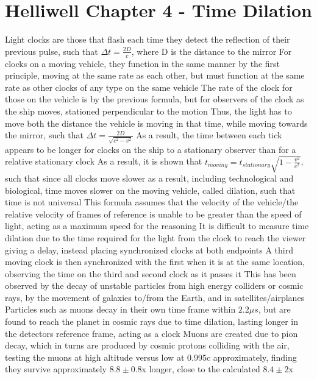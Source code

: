 \documentclass[11 pt, twoside]{article}
\newenvironment{outline*}
{
	\begin{outline}[enumerate]
	}
	{\end{outline}
}
\begin{document}
\section{Helliwell Chapter 4 - Time Dilation}
\begin{outline*}
\1 Light clocks are those that flash each time they detect the reflection of their previous pulse, such that $\Delta t = \frac{2D}{c}$, where D is the distance to the mirror
\2 For clocks on a moving vehicle, they function in the same manner by the first principle, moving at the same rate as each other, but must function at the same rate as other clocks of any type on the same vehicle
\2 The rate of the clock for those on the vehicle is by the previous formula, but for observers of the clock as the ship moves, stationed perpendicular to the motion
\3 Thus, the light has to move both the distance the vehicle is moving in that time, while moving towards the mirror, such that $\Delta t = \frac{2D}{\sqrt{c^2 - v^2}}$
\3 As a result, the time between each tick appears to be longer for clocks on the ship to a stationary observer than for a relative stationary clock
\1 As a result, it is shown that $t_{moving} = t_{stationary}\sqrt{1 - \frac{v^2}{c^2}}$, such that since all clocks move slower as a result, including technological and biological, time moves slower on the moving vehicle, called dilation, such that time is not universal
\2 This formula assumes that the velocity of the vehicle/the relative velocity of frames of reference is unable to be greater than the speed of light, acting as a maximum speed for the reasoning
\1 It is difficult to measure time dilation due to the time required for the light from the clock to reach the viewer giving a delay, instead placing synchronized clocks at both endpoints
\2 A third moving clock is then synchronized with the first when it is at the same location, observing the time on the third and second clock as it passes it
\2 This has been observed by the decay of unstable particles from high energy colliders or cosmic rays, by the movement of galaxies to/from the Earth, and in satellites/airplanes
\3 Particles such as muons decay in their own time frame within $2.2 \mu s$, but are found to reach the planet in cosmic rays due to time dilation, lasting longer in the detectors reference frame, acting as a clock
\3 Muons are created due to pion decay, which in turns are produced by cosmic protons colliding with the air, testing the muons at high altitude versus low at 0.995c approximately, finding they survive approximately $8.8 \pm 0.8$x longer, close to the calculated $8.4 \pm 2$x
\end{outline*}
\end{document}

